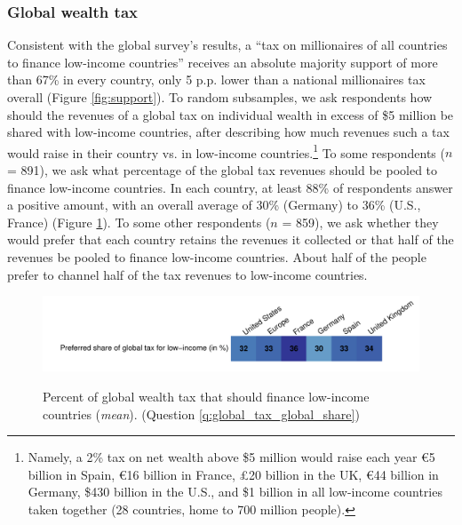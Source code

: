 \subsubsection{Global wealth tax} 
Consistent with the global survey's results, a ``tax on millionaires of all countries to finance low-income countries'' receives an absolute majority support of more than 67\% in every country, only 5 p.p. lower than a national millionaires tax overall (Figure \ref{fig:support}). %
To random subsamples, we ask respondents how should the revenues of a global tax on individual wealth in excess of \$5 million be shared with low-income countries, after describing how much revenues such a tax would raise in their country vs. in low-income countries.\footnote{Namely, a 2\% tax on net wealth above \$5 million would raise each year \euro{}5 billion in Spain, \euro{}16 billion in France, £20 billion in the UK, \euro{}44 billion in Germany, \$430 billion in the U.S., and \$1 billion in all low-income countries taken together (28 countries, home to 700 million people).} To some respondents ($n$ = 891), we ask what percentage of the global tax revenues should be pooled to finance low-income countries. In each country, at least 88\% of respondents answer a positive amount, with an overall average of 30\% (Germany) to 36\% (U.S., France) (Figure \ref{fig:global_share_mean}). To some other respondents ($n$ = 859), we ask whether they would prefer that each country retains the revenues it collected or that half of the revenues be pooled to finance low-income countries. About half of the people prefer to channel half of the tax revenues to low-income countries. 

\begin{figure}
    \centering 
    \caption[Preferred share of wealth tax for low-income countries]{Percent of global wealth tax that should finance low-income countries (\textit{mean}). (Question \ref{q:global_tax_global_share})} %
    \includegraphics[width=1\textwidth]{../figures/country_comparison/global_tax_global_share_mean.pdf} \label{fig:global_share_mean}
\end{figure}

